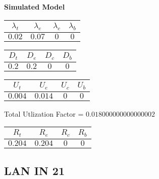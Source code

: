 \documentclass{article}
\begin{document}
\begin{minipage}{0.5\textwidth}
\centering	\textbf{Simulated Model}
\begin{table}[H]
\centering
\begin{tabular}{@{}cccc@{}}
\toprule
$\lambda_t$ & $\lambda_e$ & $\lambda_c$ & $\lambda_b$\\
\midrule
$0.02$ & $0.07$ & $0$ & $0$\\
\bottomrule
\end{tabular}
\end{table}
\begin{table}[H]
\centering
\begin{tabular}{@{}cccc@{}}
\toprule
$D_t$ & $D_e$ & $D_c$ & $D_b$\\
\midrule
$0.2$ & $0.2$ & $0$ & $0$\\
\bottomrule
\end{tabular}
\end{table}\begin{table}[H]
\centering
\begin{tabular}{@{}cccc@{}}
\toprule
$U_t$ & $U_e$ & $U_c$ & $U_b$\\
\midrule
$0.004$ & $0.014$ & $0$ & $0$\\
\bottomrule
\end{tabular}
\end{table}
\centering Total Utlization Factor = $0.018000000000000002$
\begin{table}[H]
\centering
\begin{tabular}{@{}cccc@{}}
\toprule
$R_t$ & $R_e$ & $R_c$ & $R_b$\\
\midrule
$0.204$ & $0.204$ & $0$ & $0$\\
\bottomrule
\end{tabular}
\end{table}
\end{minipage}\subsection{LAN IN 21}
\end{document}
